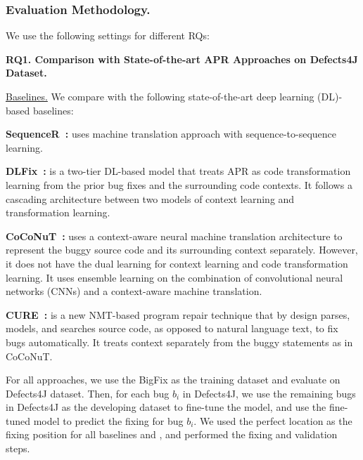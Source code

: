 \subsubsection{Evaluation Methodology.} 
We use the following settings for different RQs:

{\bf RQ1. Comparison with State-of-the-art APR Approaches on Defects4J Dataset.}

\underline{Baselines.} We compare {\tool} with the following
state-of-the-art deep learning (DL)-based baselines:



{\bf SequenceR~\cite{chen2018sequencer}: } uses machine translation
approach with sequence-to-sequence learning.

{\bf DLFix~\cite{li2020dlfix}: } is a two-tier DL-based model that
treats APR as code transformation learning from the prior bug fixes
and the surrounding code contexts. It follows a cascading architecture
between two models of context learning and transformation learning.

{\bf CoCoNuT~\cite{lutellier2020coconut}:} uses a context-aware neural
machine translation architecture to represent the buggy source code
and its surrounding context separately. However, it does not have the
dual learning for context learning and code transformation learning.
It uses ensemble learning on the combination of convolutional neural
networks (CNNs) and a context-aware machine translation.

{\bf CURE~\cite{cure-icse21}: } is a new NMT-based program repair
technique that by design parses, models, and searches source code, as
opposed to natural language text, to fix bugs automatically. It treats
context separately from the buggy statements as in CoCoNuT.


For all approaches, we use the BigFix as the training dataset and
evaluate on Defects4J dataset. Then, for each bug $b_i$ in Defects4J,
we use the remaining bugs in Defects4J as the developing dataset to
fine-tune the model, and use the fine-tuned model to predict the
fixing for bug $b_i$.
We used the perfect location as the fixing position for all baselines
and \tool, and performed the fixing and validation steps.

